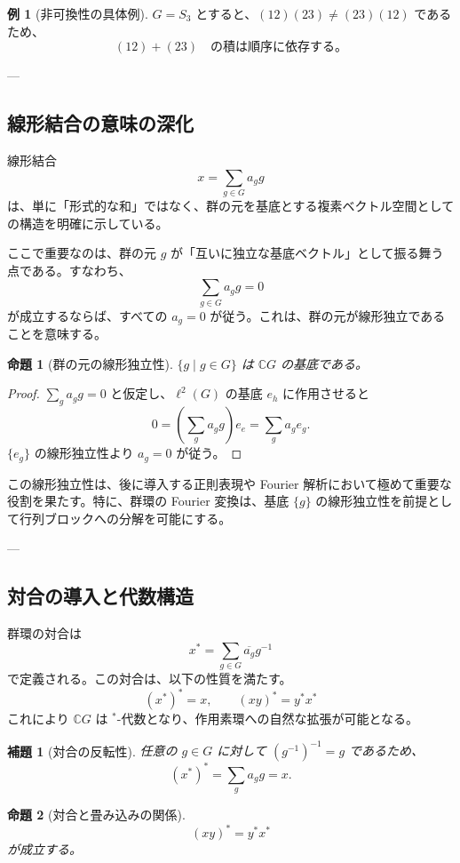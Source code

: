 \documentclass[12pt,a4paper]{ltjarticle}
\newtheorem*{lemma}{補題}
\newtheorem*{proposition}{命題}
\theoremstyle{definition}
\newtheorem*{example}{例}
\begin{document}
\begin{example}[非可換性の具体例]
$G=S_3$ とすると、$(12)(23)\neq(23)(12)$ であるため、
\[
(12)+(23) \quad\text{の積は順序に依存する。}
\]
\end{example}

---

\subsection{線形結合の意味の深化}

線形結合
\[
x = \sum_{g \in G} a_g g
\]
は、単に「形式的な和」ではなく、群の元を基底とする複素ベクトル空間としての構造を明確に示している。

ここで重要なのは、群の元 $g$ が「互いに独立な基底ベクトル」として振る舞う点である。すなわち、
\[
\sum_{g \in G} a_g g = 0
\]
が成立するならば、すべての $a_g = 0$ が従う。これは、群の元が線形独立であることを意味する。

\begin{proposition}[群の元の線形独立性]
$\{g\mid g\in G\}$ は $\mathbb{C}G$ の基底である。
\end{proposition}

\begin{proof}
$\sum_g a_g g=0$ と仮定し、$\ell^2(G)$ の基底 $e_h$ に作用させると
\[
0=\left(\sum_g a_g g\right)e_e=\sum_g a_g e_g.
\]
$\{e_g\}$ の線形独立性より $a_g=0$ が従う。
\end{proof}

この線形独立性は、後に導入する正則表現や Fourier 解析において極めて重要な役割を果たす。特に、群環の Fourier 変換は、基底 $\{g\}$ の線形独立性を前提として行列ブロックへの分解を可能にする。

---

\subsection{対合の導入と代数構造}

群環の対合は
\[
x^* = \sum_{g \in G} \overline{a_g} g^{-1}
\]
で定義される。この対合は、以下の性質を満たす。
\[
(x^*)^* = x, \qquad (xy)^* = y^* x^*
\]
これにより $\mathbb{C}G$ は $^*$-代数となり、作用素環への自然な拡張が可能となる。

\begin{lemma}[対合の反転性]
任意の $g\in G$ に対して $(g^{-1})^{-1}=g$ であるため、
\[
(x^*)^*=\sum_g a_g g=x.
\]
\end{lemma}

\begin{proposition}[対合と畳み込みの関係]
\[
(xy)^*=y^*x^*
\]
が成立する。
\end{proposition}
\end{document}
